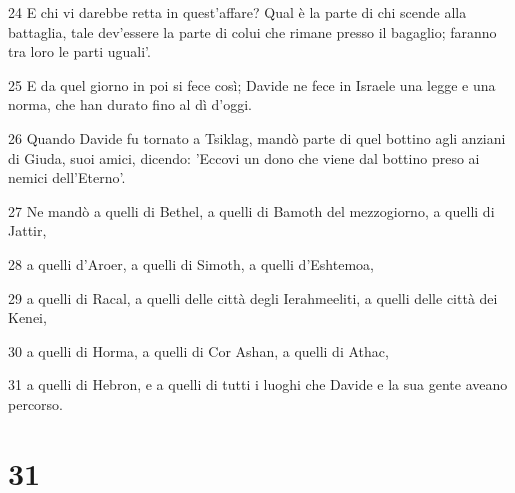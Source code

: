 \par 24 E chi vi darebbe retta in quest'affare? Qual è la parte di chi scende alla battaglia, tale dev'essere la parte di colui che rimane presso il bagaglio; faranno tra loro le parti uguali'.
\par 25 E da quel giorno in poi si fece così; Davide ne fece in Israele una legge e una norma, che han durato fino al dì d'oggi.
\par 26 Quando Davide fu tornato a Tsiklag, mandò parte di quel bottino agli anziani di Giuda, suoi amici, dicendo: 'Eccovi un dono che viene dal bottino preso ai nemici dell'Eterno'.
\par 27 Ne mandò a quelli di Bethel, a quelli di Bamoth del mezzogiorno, a quelli di Jattir,
\par 28 a quelli d'Aroer, a quelli di Simoth, a quelli d'Eshtemoa,
\par 29 a quelli di Racal, a quelli delle città degli Ierahmeeliti, a quelli delle città dei Kenei,
\par 30 a quelli di Horma, a quelli di Cor Ashan, a quelli di Athac,
\par 31 a quelli di Hebron, e a quelli di tutti i luoghi che Davide e la sua gente aveano percorso.

\chapter{31}

